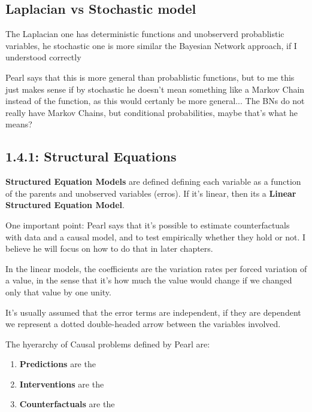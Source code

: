 \subsection{Laplacian vs Stochastic model}

The Laplacian one has deterministic functions and unobserverd probablistic variables, he stochastic one is more similar the Bayesian Network approach, if I understood correctly

Pearl says that this is more general than probablistic functions, but to me this just makes sense if by stochastic he doesn't mean something like a Markov Chain instead of the function, as this would certanly be more general... The BNs do not really have Markov Chains, but conditional probabilities, maybe that's what he means?


\subsection{1.4.1: Structural Equations}

\textbf{Structured Equation Models} are defined defining each variable as a function of the parents and unobserved variables (erros). If it's linear, then its a \textbf{Linear Structured Equation Model}.

One important point: Pearl says that it's possible to estimate counterfactuals with data and a causal model, and to test empirically whether they hold or not. I believe he will focus on how to do that in later chapters.

In the linear models, the coefficients are the variation rates per forced variation of a value, in the sense that it's how much the value would change if we changed only that value by one unity.

It's usually assumed that the error terms are independent, if they are dependent we represent a dotted double-headed arrow between the variables involved.

The hyerarchy of Causal problems defined by Pearl are:

\begin{enumerate}
    \item \textbf{Predictions} are the 
    \item \textbf{Interventions} are the 
    \item \textbf{Counterfactuals} are the 
\end{enumerate}

